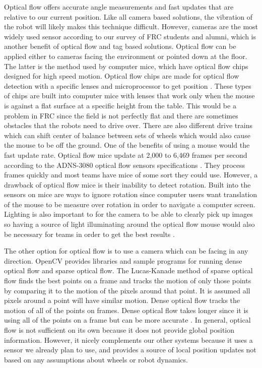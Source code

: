 \documentclass{article}
\begin{document}
  Optical flow offers accurate angle measurements and fast updates that are relative to our current position. Like all camera based solutions, the vibration of the robot will likely makes this technique difficult. However, cameras are the most widely used sensor according to our survey of FRC students and alumni, which is another benefit of optical flow and tag based solutions. Optical flow can be applied either to cameras facing the environment or pointed down at the floor.
  The latter is the method used by computer mice, which have optical flow chips designed for high speed motion. Optical flow chips are made for optical flow detection with a specific lenses and microprocessor to get position \cite{font_characterization_2011}. These types of chips are built into computer mice with lenses that work only when the mouse is against a flat surface at a specific height from the table. This would be a problem in FRC since the field is not perfectly flat and there are sometimes obstacles that the robots need to drive over. There are also different drive trains which can shift center of balance between sets of wheels which would also cause the mouse to be off the ground. One of the benefits of using a mouse would the fast update rate. Optical flow mice update at 2,000 to 6,469 frames per second according to the ADNS-3080 optical flow sensors specifications \cite{noauthor_sensors_nodate}. They process frames quickly and most teams have mice of some sort they could use. However, a drawback of optical flow mice is their inability to detect rotation. Built into the sensors on mice are ways to ignore rotation since computer users want translation of the mouse to be measure over rotation in order to navigate a computer screen. Lighting is also important to for the camera to be able to clearly pick up images so having a source of light illuminating around the optical flow mouse would also be necessary for teams in order to get the best results \cite{font_characterization_2011}.

  The other option for optical flow is to use a camera which can be facing in any direction. OpenCV provides libraries and sample programs for running dense optical flow and sparse optical flow. The Lucas-Kanade method of sparse optical flow finds the best points on a frame and tracks the motion of only those points by comparing it to the motion of the pixels around that point. It is assumed all pixels around a point will have similar motion. Dense optical flow tracks the motion of all of the points on frames. Dense optical flow takes longer since it is using all of the points on a frame but can be more accurate \cite{itseez_opencv_2017}. In general, optical flow is not sufficient on its own because it does not provide global position information. However, it nicely complements our other systems because it uses a sensor we already plan to use, and provides a source of local position updates not based on any assumptions about wheels or robot dynamics.
\end{document}
